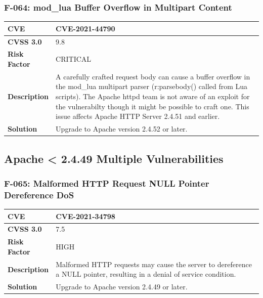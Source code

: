 \subsubsection{F-064: mod\_lua Buffer Overflow in Multipart Content}
\begin{tabular}{|p{2.8cm}|p{12.2cm}|}
\hline
\textbf{CVE} & CVE-2021-44790 \\ \hline
\textbf{CVSS 3.0} & 9.8 \\ \hline
\textbf{Risk Factor} & CRITICAL \\ \hline
\textbf{Description} & A carefully crafted request body can cause a buffer overflow in the mod\_lua multipart parser (r:parsebody() called from Lua scripts). The Apache httpd team is not aware of an exploit for the vulnerabilty though it might be possible to craft one. This issue affects Apache HTTP Server 2.4.51 and earlier. \\ \hline
\textbf{Solution} & Upgrade to Apache version 2.4.52 or later. \\ \hline
\end{tabular}

%
%
\subsection{Apache < 2.4.49 Multiple Vulnerabilities}

\subsubsection{F-065: Malformed HTTP Request NULL Pointer Dereference DoS}
\begin{tabular}{|p{2.8cm}|p{12.2cm}|}
\hline
\textbf{CVE} & CVE-2021-34798 \\ \hline
\textbf{CVSS 3.0} & 7.5 \\ \hline
\textbf{Risk Factor} & HIGH \\ \hline
\textbf{Description} & Malformed HTTP requests may cause the server to dereference a NULL pointer, resulting in a denial of service condition. \\ \hline
\textbf{Solution} & Upgrade to Apache version 2.4.49 or later. \\ \hline
\end{tabular}

